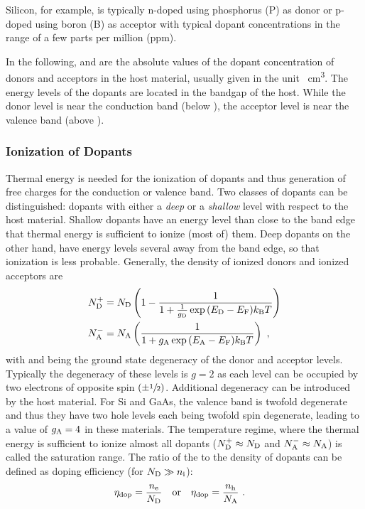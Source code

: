 Silicon, for example, is typically n-doped using phosphorus (P) as donor or p-doped using boron (B) as acceptor with typical dopant concentrations in the range of a few parts per million (ppm).

In the following, \Nd and \Na are the absolute values of the dopant concentration of donors and acceptors in the host material, usually given in the unit \si{\per\centi\meter\cubed}.
The energy levels of the dopants are located in the bandgap of the host. While the donor level \Ed is near the conduction band (below \Ec), the acceptor level \Ea is near the valence band (above \Ev).

\subsubsection{Ionization of Dopants}
Thermal energy is needed for the ionization of dopants and thus generation of free charges for the conduction or valence band. Two classes of dopants can be distinguished: dopants with either a \emph{deep} or a \emph{shallow} level with respect to the host material. Shallow dopants have an energy level than close to the band edge that thermal energy is sufficient to ionize (most of) them. Deep dopants on the other hand, have energy levels several \kT away from the band edge, so that ionization is less probable.
Generally, the density of ionized donors \Ndi and ionized acceptors \Nai are\cite{Shockley}
\begin{align}
\Ndi &= \Nd \left(
1-
\frac
{1}
{1 + \frac{1}{\gd} \exp{\Ed-\Ef}{\kT}}
\right)
\label{eq:DefNdi}
\\
\Nai &=\Na
\left(
\frac
{1}
{1 + \ga \exp{\Ea-\Ef}{\kT}} \right)
\label{eq:DefNai}
\KOMMA
\end{align}
with \ga and \gd being the ground state degeneracy of the donor and acceptor levels. Typically the degeneracy of these levels is $g=2$ as each level can be occupied by two electrons of opposite spin $(\pm\sfrac{1}{2})$. Additional degeneracy can be introduced by the host material. For Si and GaAs, the valence band is twofold degenerate and thus they have two hole levels each being twofold spin degenerate, leading to a value of $g_\text{A}=4$ in these materials.
The temperature regime, where the thermal energy is sufficient to ionize almost all dopants ($N_\text{D}^+\approx N_\text{D}$ and $N_\text{A}^-\approx N_\text{A}$) is called the saturation range.
%
The ratio of the \nLong \neh to the density of dopants can be defined as doping efficiency \DopEff (for $N_\text{D}\gg n_\text{i}$):
\begin{align}
 \DopEff &= \frac{\ne}{\Nd} \quad \text{or}\quad \DopEff = \frac{\nh}{\Na}
\label{eq:DepEff-inorg}
\PUNKT
\end{align}

